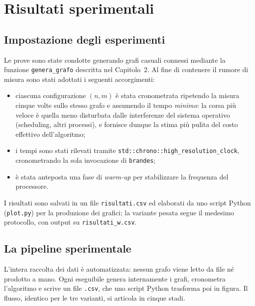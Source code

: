 \documentclass[11pt,a4paper]{report}
\begin{document}
\chapter{Risultati sperimentali}

\section{Impostazione degli esperimenti}

Le prove sono state condotte generando grafi casuali connessi mediante la funzione
\texttt{genera\_grafo} descritta nel Capitolo~2. Al fine di contenere il rumore di
misura sono stati adottati i seguenti accorgimenti:
\begin{itemize}
	\item ciascuna configurazione $(n,m)$ è stata cronometrata ripetendo la misura
	      cinque volte sullo stesso grafo e assumendo il tempo \emph{minimo}: la
	      corsa più veloce è quella meno disturbata dalle interferenze del sistema
	      operativo (scheduling, altri processi), e fornisce dunque la stima più
	      pulita del costo effettivo dell'algoritmo;
	\item i tempi sono stati rilevati tramite
	      \texttt{std::chrono::high\_resolution\_clock}, cronometrando la sola
	      invocazione di \texttt{brandes};
	\item è stata anteposta una fase di \emph{warm-up} per stabilizzare la frequenza
	      del processore.
\end{itemize}
I risultati sono salvati in un file \texttt{risultati.csv} ed elaborati da uno
script Python (\texttt{plot.py}) per la produzione dei grafici; la variante pesata
segue il medesimo protocollo, con output su \texttt{risultati\_w.csv}.

\section{La pipeline sperimentale}

L'intera raccolta dei dati è automatizzata: nessun grafo viene letto da file né
prodotto a mano. Ogni eseguibile genera internamente i grafi, cronometra
l'algoritmo e scrive un file \texttt{.csv}, che uno script Python trasforma poi in
figura. Il flusso, identico per le tre varianti, si articola in cinque stadi.
\end{document}
